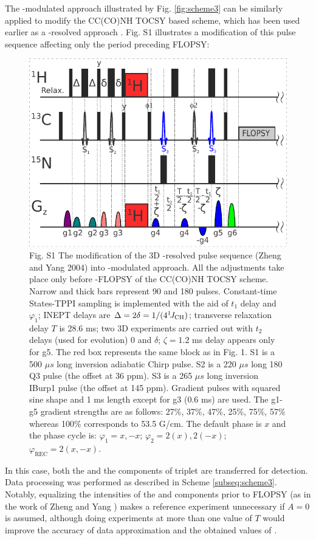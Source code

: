 \documentclass[smallextended]{svjour3}
\begin{document}
\newpage
The \oneJch-modulated approach illustrated by Fig. \ref{fig:scheme3} 
      can be similarly applied to modify the {CC(CO)NH} {TOCSY} based 
      scheme, which has been used earlier as a \oneJch-resolved approach
      \cite{zheng_measurement_2004}. Fig. S1 illustrates a modification of
      this pulse sequence affecting only the period preceding \clab{} 
      {FLOPSY}:
\begin{figure}
    \centering
    \includegraphics{FigS1.pdf}
    \caption{
       Fig. S1 The modification of the 3D \oneJch-resolved pulse sequence (Zheng and Yang 2004) into \oneJch-modulated approach. All the adjustments take place only before \clab{}-FLOPSY of the CC(CO)NH TOCSY scheme. Narrow and thick bars represent 90\degree{} and 180\degree{} pulses. Constant-time \clab{} States-TPPI sampling is implemented with the aid of $t_1$ delay and $\varphi_1$; INEPT delays are $\Delta = 2\delta = 1/(4^1\!J_\text{CH})$; transverse relaxation delay $T$ is 28.6 ms; two 3D experiments are carried out with $t_2$ delays (used for \oneJch evolution) 0 and $\delta$; $\zeta = 1.2$ ms delay appears only for g5. The red box represents the same block as in Fig. 1. S1 is a 500 $\mu s$ long \clab{} inversion adiabatic Chirp pulse. S2 is a 220 $\mu s$ long 180\degree{} Q3 pulse (the offset at 36 ppm). S3 is a 265 $\mu s$ long inversion IBurp1 pulse (the offset at 145 ppm). Gradient pulses with squared sine shape and 1 ms length except for g3 (0.6 ms) are used. The g1-g5 gradient strengths are as follows: 27\%, 37\%, 47\%, 25\%, 75\%, 57\% whereas 100\% corresponds to 53.5 G/cm. The default phase is $x$ and the phase cycle is:
       $\varphi_1 = x, -x$;
       $\varphi_2 = 2(x), 2(-x)$;
       $\varphi_\text{REC} = 2(x, -x)$.
    }
    \label{fig:scheme4}
\end{figure}
In this case, both the \qouter{} and the \qinner{} 
      components of \clab{} triplet are transferred for detection. 
      Data processing was performed as described in Scheme
      \ref{subseq:scheme3}. Notably, equalizing the intensities of the 
      \qouter{} and \qinner{} components prior to {FLOPSY} (as in the work 
      of Zheng and Yang \cite{zheng_measurement_2004}) makes a reference
      experiment unnecessary if $A = 0$ is assumed, although doing 
      experiments at more than one value of $T$ would improve the accuracy 
      of data approximation and the obtained values of \gtwoCH.
\end{document}
